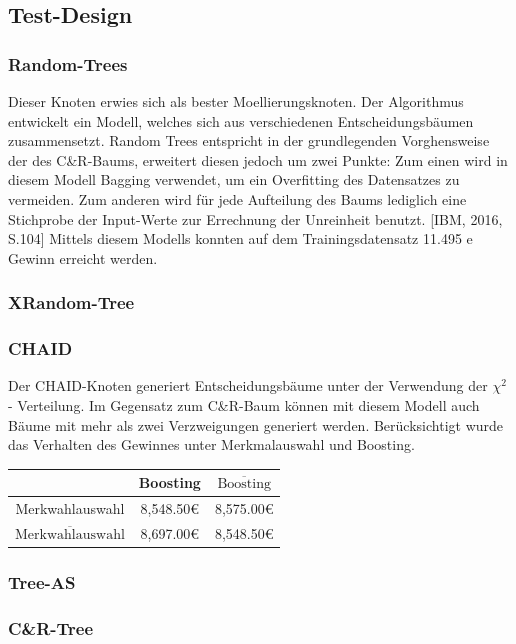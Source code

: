 \documentclass[a4paper,12pt]{article}
\newcounter{Algorithmus}
\begin{document}
\subsection{Test-Design}
\subsubsection{Random-Trees}
Dieser Knoten erwies sich als bester Moellierungsknoten.
 Der Algorithmus entwickelt ein Modell, welches sich aus verschiedenen Entscheidungsbäumen zusammensetzt.
 Random Trees entspricht in der grundlegenden Vorghensweise der des C\&R-Baums, erweitert
diesen jedoch um zwei Punkte: Zum einen wird in diesem Modell Bagging verwendet, um
ein Overfitting des Datensatzes zu vermeiden. Zum anderen wird für jede Aufteilung des Baums
lediglich eine Stichprobe der Input-Werte zur Errechnung der Unreinheit benutzt. [IBM, 2016,
S.104] Mittels diesem Modells konnten auf dem Trainingsdatensatz 11.495 e Gewinn erreicht
werden.
\subsubsection{XRandom-Tree}
\subsubsection{CHAID}
Der CHAID-Knoten generiert Entscheidungsbäume unter der Verwendung der $\chi^2$  - Verteilung.
Im Gegensatz zum C\&R-Baum können mit diesem Modell auch Bäume mit mehr als zwei
Verzweigungen generiert werden. Berücksichtigt wurde das Verhalten des Gewinnes unter Merkmalauswahl und Boosting. 

\begin{center}
\begin{tabular}{ c | c | c }
 & Boosting & $\overline{\text{Boosting}}$
\\
\hline
Merkwahlauswahl  &  8,548.50\euro & 8,575.00\euro
\\
$\overline{\text{Merkwahlauswahl}}$ & 8,697.00\euro  &  8,548.50\euro
\\
\end{tabular}
\end{center}
\subsubsection{Tree-AS}
\subsubsection{C\&R-Tree}
\end{document}
